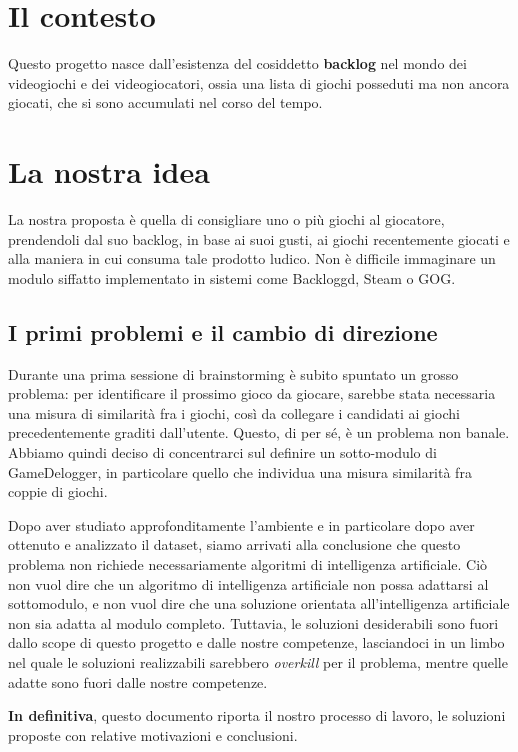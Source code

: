 \section{Il contesto}
Questo progetto nasce dall'esistenza del cosiddetto \textbf{backlog} nel mondo dei videogiochi e dei videogiocatori, ossia una lista di giochi posseduti ma non ancora giocati, che si sono accumulati nel corso del tempo.

\section{La nostra idea}
La nostra proposta è quella di consigliare uno o più giochi al giocatore, prendendoli dal suo backlog, in base ai suoi gusti, ai giochi recentemente giocati e alla maniera in cui consuma tale prodotto ludico. Non è difficile immaginare un modulo siffatto implementato in sistemi come Backloggd, Steam o GOG.
    \subsection{I primi problemi e il cambio di direzione}
        Durante una prima sessione di brainstorming è subito spuntato un grosso problema: per identificare il prossimo gioco da giocare, sarebbe stata necessaria una misura di similarità fra i giochi, così da collegare i candidati ai giochi precedentemente graditi dall'utente. Questo, di per sé, è un problema non banale. Abbiamo quindi deciso di concentrarci sul definire un sotto-modulo di GameDelogger, in particolare quello che individua una misura similarità fra coppie di giochi.
    
        Dopo aver studiato approfonditamente l'ambiente e in particolare dopo aver ottenuto e analizzato il dataset, siamo arrivati alla conclusione che questo problema non richiede necessariamente algoritmi di intelligenza artificiale. Ciò non vuol dire che un algoritmo di intelligenza artificiale non possa adattarsi al sottomodulo, e non vuol dire che una soluzione orientata all'intelligenza artificiale non sia adatta al modulo completo. Tuttavia, le soluzioni desiderabili sono fuori dallo scope di questo progetto e dalle nostre competenze, lasciandoci in un limbo nel quale le soluzioni realizzabili sarebbero \textit{overkill} per il problema, mentre quelle adatte sono fuori dalle nostre competenze.
        
        \textbf{In definitiva}, questo documento riporta il nostro processo di lavoro, le soluzioni proposte con relative motivazioni e conclusioni.
